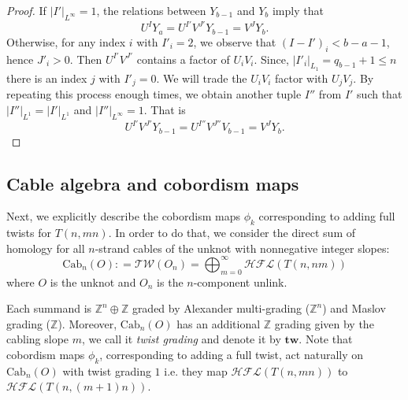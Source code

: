 \documentclass[10pt,a4paper]{amsart}
\newcommand{\Cab}{\mathrm{Cab}}
\newcommand{\Tw}{\mathcal{TW}}
\newcommand{\cHFL}{\mathcal{H\!F\! L}}
\newcommand{\tw}{\mathbf{tw}}
\newcommand{\Z}{\mathbb{Z}}
\begin{document}
\begin{proof}
If $|I'|_{L^\infty}=1$, the relations between $Y_{b-1}$ and $Y_b$ imply that
$$U^I Y_a=U^{I'} V^{J'}Y_{b-1}=V^J Y_{b}.$$
Otherwise, for any  index $i$ with  $I'_i=2$, we observe that $(I-I')_i<b-a-1$, hence $J'_i>0$. Then $U^{I'} V^{J'}$ contains a factor of $U_iV_i$. Since, $|I'_i|_{L_1}=q_{b-1}+1\le n$ there is an index $j$ with $I'_j=0$. We will trade the $U_iV_i$ factor with $U_jV_j$.  By repeating this process enough times, we obtain another tuple $I''$ from $I'$ such that $|I''|_{L^1}=|I'|_{L^1}$ and $|I''|_{L^\infty}=1$. That is
$$U^{I'} V^{J'} Y_{b-1}=U^{I''}V^{J''}V_{b-1}=V^{J} Y_{b}.$$
\end{proof}

\subsection{Cable algebra and cobordism maps} Next, we explicitly describe the cobordism maps $\phi_k$ corresponding to adding full twists  for $T(n,mn)$. In order to do that, we consider the direct sum of homology for all $n$-strand cables of the unknot with nonnegative integer slopes:
\begin{equation}\label{eq:CabU}
\Cab_n(O): =\Tw(O_n)=\bigoplus_{m=0}^{\infty}\cHFL(T(n,nm))
\end{equation}
where $O$ is the unknot and  $O_n$ is the $n$-component unlink. 

Each summand is $\Z^n\oplus \Z$ graded by Alexander multi-grading ($\Z^n$) and Maslov grading ($\Z$). Moreover, $\Cab_n(O)$ has an additional $\Z$ grading given by the cabling slope $m$, we call it \emph{twist grading} and denote it by $\tw$. Note that cobordism maps $\phi_k$, corresponding to adding a full twist, act naturally on $\Cab_n(O)$ with twist grading $1$ i.e. they map $\cHFL(T(n,mn))$ to $\cHFL(T(n,(m+1)n))$. 
\end{document}
